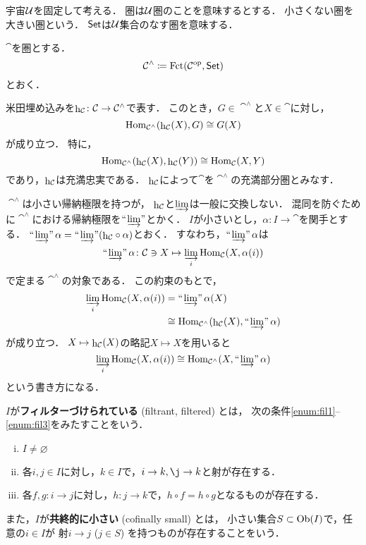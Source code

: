宇宙$\U$を固定して考える．
圏は$\U$圏のことを意味するとする．
小さくない圏を大きい圏という．
$\Set$は$\U$集合のなす圏を意味する．

\begin{Definition}
    $\cat$を圏とする．
    \begin{equation*}
        \cat^\wedge\coloneqq\Fct(\cat^\op,\Set)
    \end{equation*}
    とおく．
\end{Definition}

米田埋め込みを$\hh_\cat\colon\cat\to\cat^\wedge$で表す．
このとき，$G\in\cat^\wedge$と$X\in\cat$に対し，
\begin{equation}
    \Hom_{\cat^\wedge}(\hh_\cat(X),G)\cong G(X)
\end{equation}
が成り立つ．
特に，
\begin{equation*}
    \Hom_{\cat^\wedge}(\hh_\cat(X),\hh_\cat(Y))
    \cong 
    \Hom_\cat(X,Y)
\end{equation*}
であり，$\hh_\cat$は充満忠実である．
$\hh_\cat$によって$\cat$を$\cat^\wedge$の充満部分圏とみなす．

$\cat^\wedge$は小さい帰納極限を持つが，
$\hh_\cat$と$\varinjlim$は一般に交換しない．
混同を防ぐために$\cat^\wedge$における帰納極限を$\limf$とかく．
$I$が小さいとし，$\alpha\colon I\to\cat$を関手とする．
$\limf\alpha=\limf({\hh}_\cat\circ\alpha)$とおく．
すなわち，$\limf\alpha$は
\begin{equation*}
    \limf\alpha\colon\cat\ni X\mapsto\varinjlim_i\Hom_\cat(X,\alpha(i))
\end{equation*}
で定まる$\cat^\wedge$の対象である．
この約束のもとで，
\begin{align*}
    \varinjlim_i\Hom_\cat(X,\alpha(i))
    &=\limf\alpha(X)\\
    &\cong\Hom_{\cat^\wedge}(\hh_\cat(X),\limf\alpha)
\end{align*}
が成り立つ．
\(X\mapsto\hh_\cat(X)\)の略記\(X\mapsto{X}\)を用いると
\begin{equation*}
    \varinjlim_i\Hom_\cat(X,\alpha(i))
    \cong\Hom_{\cat^\wedge}(X,\limf\alpha)
\end{equation*}
という書き方になる．
\begin{Definition}
    \(I\)が\textbf{フィルターづけられている} (filtrant, filtered) とは，
    次の条件\eqref{enum:fil1}--\eqref{enum:fil3}をみたすことをいう．
    \begin{enumerate}[(i)]
        \item \(I\ne\varnothing\)\label{enum:fil1}
        \item 各\(i,j\in{I}\)に対し，\(k\in{I}\)で，\(i\to{k},\j\to{k}\)と射が存在する．\label{enum:fil2}
        \item 各\(f,g\colon i\to{j}\)に対し，\(h\colon j\to k\)で，\(h\circ f= h\circ g\)となるものが存在する．\label{enum:fil3}    
    \end{enumerate}

    また，\(I\)が\textbf{共終的に小さい} (cofinally small) とは，
    小さい集合\(S\subset\Ob(I)\)で，任意の\(i\in I\)が
    射\(i\to j\) (\(j \in S\)) を持つものが存在することをいう．
\end{Definition}

